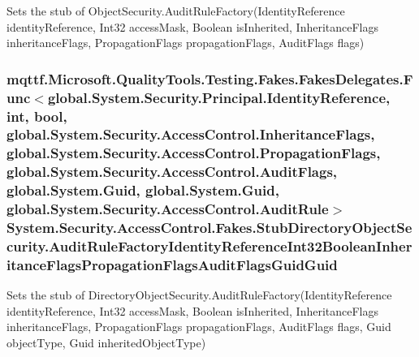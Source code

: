 Sets the stub of Object\-Security.\-Audit\-Rule\-Factory(\-Identity\-Reference identity\-Reference, Int32 access\-Mask, Boolean is\-Inherited, Inheritance\-Flags inheritance\-Flags, Propagation\-Flags propagation\-Flags, Audit\-Flags flags)

\hypertarget{class_system_1_1_security_1_1_access_control_1_1_fakes_1_1_stub_directory_object_security_a306643011b8d57f21dc3080711e69aed}{
\subsubsection[{Audit\-Rule\-Factory\-Identity\-Reference\-Int32\-Boolean\-Inheritance\-Flags\-Propagation\-Flags\-Audit\-Flags\-Guid\-Guid}]{\setlength{\rightskip}{0pt plus 5cm}mqttf.\-Microsoft.\-Quality\-Tools.\-Testing.\-Fakes.\-Fakes\-Delegates.\-Func$<$global.\-System.\-Security.\-Principal.\-Identity\-Reference, int, bool, global.\-System.\-Security.\-Access\-Control.\-Inheritance\-Flags, global.\-System.\-Security.\-Access\-Control.\-Propagation\-Flags, global.\-System.\-Security.\-Access\-Control.\-Audit\-Flags, global.\-System.\-Guid, global.\-System.\-Guid, global.\-System.\-Security.\-Access\-Control.\-Audit\-Rule$>$ System.\-Security.\-Access\-Control.\-Fakes.\-Stub\-Directory\-Object\-Security.\-Audit\-Rule\-Factory\-Identity\-Reference\-Int32\-Boolean\-Inheritance\-Flags\-Propagation\-Flags\-Audit\-Flags\-Guid\-Guid}}\label{class_system_1_1_security_1_1_access_control_1_1_fakes_1_1_stub_directory_object_security_a306643011b8d57f21dc3080711e69aed}


Sets the stub of Directory\-Object\-Security.\-Audit\-Rule\-Factory(\-Identity\-Reference identity\-Reference, Int32 access\-Mask, Boolean is\-Inherited, Inheritance\-Flags inheritance\-Flags, Propagation\-Flags propagation\-Flags, Audit\-Flags flags, Guid object\-Type, Guid inherited\-Object\-Type)

